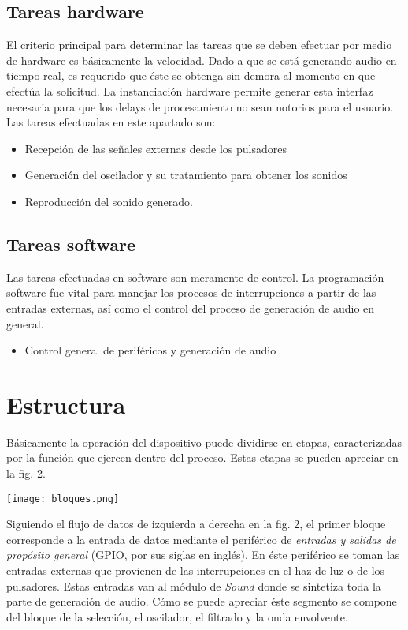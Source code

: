 \documentclass[12pt,journal]{IEEEtran}
\begin{document}
\subsection*{Tareas hardware}
El criterio principal para determinar las tareas que se deben efectuar por medio de hardware es b\'asicamente la velocidad. Dado a que se est\'a generando audio en tiempo real, es requerido que \'este se obtenga sin demora al momento en que efect\'ua la solicitud. La instanciaci\'on hardware permite generar esta interfaz necesaria para que los delays de procesamiento no sean notorios para el usuario. Las tareas efectuadas en este apartado son:
\begin{itemize}
	\item Recepci\'on de las se\~nales externas desde los pulsadores
	\item Generaci\'on del oscilador y su tratamiento para obtener los sonidos
	\item Reproducci\'on del sonido generado.
\end{itemize}

\subsection*{Tareas software}
Las tareas efectuadas en software son meramente de control. La programaci\'on software fue vital para manejar los procesos de interrupciones a partir de las entradas externas, as\'i como el control del proceso de generaci\'on de audio en general.
\begin{itemize}
	\item Control general de perif\'ericos y generaci\'on de audio
\end{itemize}

\section{Estructura}
B\'asicamente la operaci\'on del dispositivo puede dividirse en etapas, caracterizadas por la funci\'on que ejercen dentro del proceso. Estas etapas se pueden apreciar en la fig. 2.

\begin{center}
	\texttt{[image: bloques.png]}
\end{center}

Siguiendo el flujo de datos de izquierda a derecha en la fig. 2, el primer bloque corresponde a la entrada de datos mediante el perif\'erico de \emph{entradas y salidas de prop\'osito general} (GPIO, por sus siglas en ingl\'es). En \'este perif\'erico se toman las entradas externas que provienen de las interrupciones en el haz de luz o de los pulsadores. Estas entradas van al m\'odulo de \emph{Sound} donde se sintetiza toda la parte de generaci\'on de audio. C\'omo se puede apreciar \'este segmento se compone del bloque de la selecci\'on, el oscilador, el filtrado y la onda envolvente.
\end{document}
